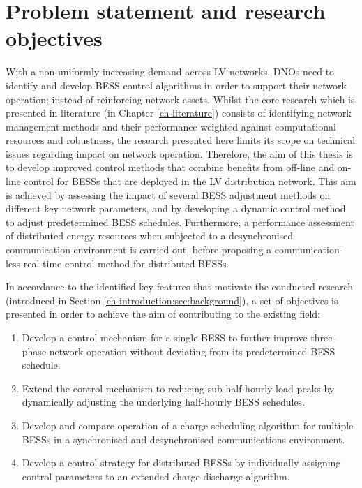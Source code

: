 \section{Problem statement and research objectives}
\label{ch-introduction:sec:problem-statement}

With a non-uniformly increasing demand across LV networks, DNOs need to identify and develop BESS control algorithms in order to support their network operation; instead of reinforcing network assets.
Whilst the core research which is presented in literature (in Chapter \ref{ch-literature}) consists of identifying network management methods and their performance weighted against computational resources and robustness, the research presented here limits its scope on technical issues regarding impact on network operation.
Therefore, the aim of this thesis is to develop improved control methods that combine benefits from off-line and on-line control for BESSs that are deployed in the LV distribution network.
This aim is achieved by assessing the impact of several BESS adjustment methods on different key network parameters, and by developing a dynamic control method to adjust predetermined BESS schedules.
Furthermore, a performance assessment of distributed energy resources when subjected to a desynchronised communication environment is carried out, before proposing a communication-less real-time control method for distributed BESSs.

In accordance to the identified key features that motivate the conducted research (introduced in Section \ref{ch-introduction:sec:background}), a set of objectives is presented in order to achieve the aim of contributing to the existing field:

\begin{enumerate}
	\item Develop a control mechanism for a single BESS to further improve three-phase network operation without deviating from its predetermined BESS schedule.
	\item Extend the control mechanism to reducing sub-half-hourly load peaks by dynamically adjusting the underlying half-hourly BESS schedules.
	\item Develop and compare operation of a charge scheduling algorithm for multiple BESSs in a synchronised and desynchronised communications environment.
	\item Develop a control strategy for distributed BESSs by individually assigning control parameters to an extended charge-discharge-algorithm.
\end{enumerate}

